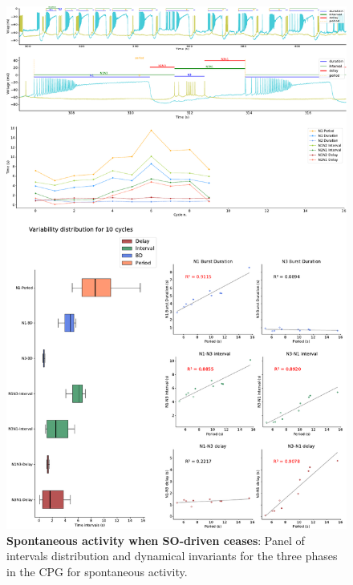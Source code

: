\begin{figure}[htbp]
	\centering
	\includegraphics[width=\textwidth]{./invariants/data/SUSSEX/prep4_so_no_driven/images/panel_with_intervals.pdf}
	\caption{\textbf{Spontaneous activity when SO-driven ceases}: Panel of intervals distribution and dynamical invariants for the three phases in the CPG for spontaneous activity.}
	\label{fig:no so spontaneous invariants}
\end{figure}
 	 
 


